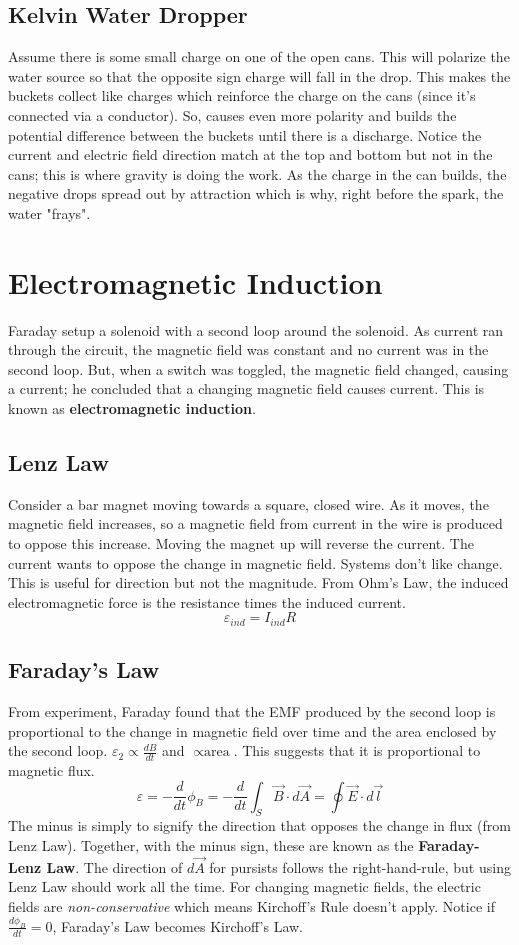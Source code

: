 \documentclass{article}
\begin{document}
\subsection{Kelvin Water Dropper}
Assume there is some small charge on one of the open cans. This will polarize the water source so that the opposite sign charge 
will fall in the drop. This makes the buckets collect like charges which reinforce the charge on the cans (since it's connected via a conductor).
So, causes even more polarity and builds the potential difference between the buckets until there is a discharge. 
Notice the current and electric field direction match at the top and bottom but not in the cans; this is where gravity is doing the work.
As the charge in the can builds, the negative drops spread out by attraction which is why, right before the spark, the water "frays".

\section{Electromagnetic Induction}
Faraday setup a solenoid with a second loop around the solenoid. As current ran through the circuit, the magnetic field was constant
and no current was in the second loop. But, when a switch was toggled, the magnetic field changed, causing a current; he concluded that
a changing magnetic field causes current. This is known as \textbf{electromagnetic induction}.

\subsection{Lenz Law}
Consider a bar magnet moving towards a square, closed wire. As it moves, the magnetic field increases, so a magnetic field 
from current in the wire is produced to oppose this increase. Moving the magnet up will reverse the current. The current wants
to oppose the change in magnetic field. Systems don't like change. This is useful for direction but not the magnitude.
From Ohm's Law, the induced electromagnetic force is the resistance times the induced current.
$$\varepsilon_{ind}=I_{ind}R$$

\subsection{Faraday's Law}
From experiment, Faraday found that the EMF produced by the second loop is proportional to the change in magnetic field
over time and the area enclosed by the second loop. $\varepsilon_{2}\propto \frac{dB}{dt}$ and $\propto \text{area}$.
This suggests that it is proportional to magnetic flux.
$$\varepsilon=-\frac{d}{dt}\phi_{B}=-\frac{d}{dt}\int_{S}\vec{B}\cdot d\vec{A}=\oint \vec{E}\cdot d\vec{l}$$
The minus is simply to signify the direction that opposes the change in flux (from Lenz Law). Together, with the minus sign,
these are known as the \textbf{Faraday-Lenz Law}. The direction of $d\vec{A}$ for pursists follows the right-hand-rule, but using
Lenz Law should work all the time. For changing magnetic fields, the electric fields are {\it non-conservative} which means Kirchoff's
Rule doesn't apply. Notice if $\frac{d\phi_{B}}{dt}=0$, Faraday's Law becomes Kirchoff's Law.
\end{document}
